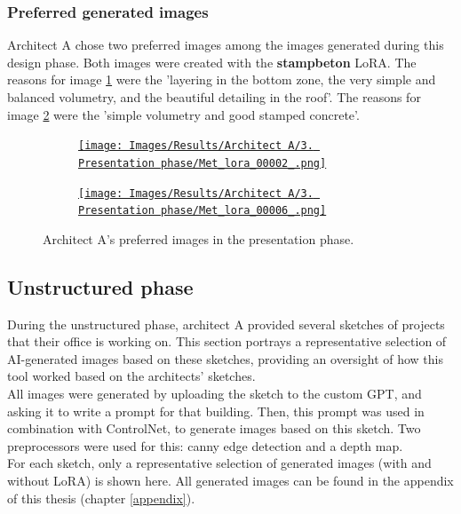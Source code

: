 \subsubsection{Preferred generated images}
Architect A chose two preferred images among the images generated during this design phase. Both images were created with the \textbf{stampbeton} LoRA. The reasons for image \ref{fig:A-presentation-preferred-A} were the 'layering in the bottom zone, the very simple and balanced volumetry, and the beautiful detailing in the roof'. The reasons for image \ref{fig:A-presentation-preferred-B} were the 'simple volumetry and good stamped concrete'.
\begin{figure}[H]
    \centering
    \begin{subfigure}[b]{0.3\textwidth}
        \centering
        \href{https://github.com/matijspeeters/Thesis/blob/main/Images/Results/Architect%20A/3.%20Presentation%20phase/Met_lora_00002_.png}{\texttt{[image: Images/Results/Architect A/3. Presentation phase/Met\_lora\_00002\_.png]}}
        \caption{}
        \label{fig:A-presentation-preferred-A}
    \end{subfigure}
    \begin{subfigure}[b]{0.3\textwidth}
        \centering
         \href{https://github.com/matijspeeters/Thesis/blob/main/Images/Results/Architect%20A/3.%20Presentation%20phase/Met_lora_00006_.png}{\texttt{[image: Images/Results/Architect A/3. Presentation phase/Met\_lora\_00006\_.png]}}
         \caption{}
         \label{fig:A-presentation-preferred-B}
    \end{subfigure}
    \caption{Architect A's preferred images in the presentation phase.}
    \label{fig:A-presentation-preferred}
\end{figure}
\newpage
\subsection{Unstructured phase}
During the unstructured phase, architect A provided several sketches of projects that their office is working on. This section portrays a representative selection of AI-generated images based on these sketches, providing an oversight of how this tool worked based on the architects' sketches.\\
All images were generated by uploading the sketch to the custom GPT, and asking it to write a prompt for that building. Then, this prompt was used in combination with ControlNet, to generate images based on this sketch. Two preprocessors were used for this: canny edge detection and a depth map.\\
For each sketch, only a representative selection of generated images (with and without LoRA) is shown here. All generated images can be found in the appendix of this thesis (chapter \ref{appendix}).
